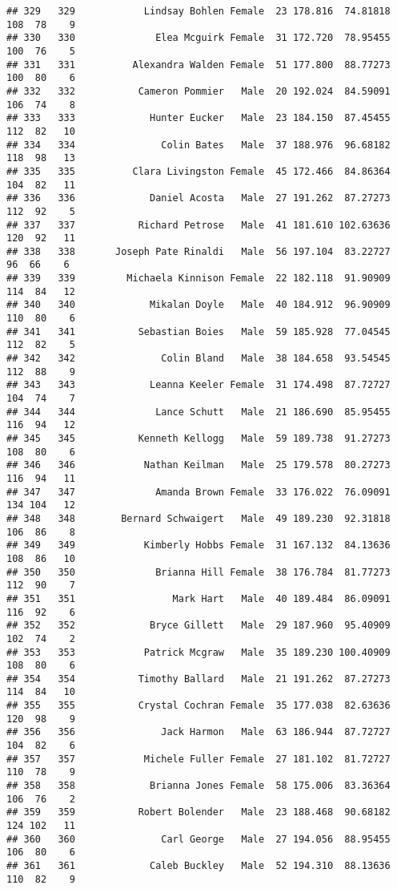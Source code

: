 \documentclass[
]{article}
\begin{document}
\begin{verbatim}
## 329   329            Lindsay Bohlen Female  23 178.816  74.81818 108  78    9
## 330   330              Elea Mcguirk Female  31 172.720  78.95455 100  76    5
## 331   331          Alexandra Walden Female  51 177.800  88.77273 100  80    6
## 332   332           Cameron Pommier   Male  20 192.024  84.59091 106  74    8
## 333   333             Hunter Eucker   Male  23 184.150  87.45455 112  82   10
## 334   334               Colin Bates   Male  37 188.976  96.68182 118  98   13
## 335   335          Clara Livingston Female  45 172.466  84.86364 104  82   11
## 336   336             Daniel Acosta   Male  27 191.262  87.27273 112  92    5
## 337   337           Richard Petrose   Male  41 181.610 102.63636 120  92   11
## 338   338       Joseph Pate Rinaldi   Male  56 197.104  83.22727  96  66    6
## 339   339         Michaela Kinnison Female  22 182.118  91.90909 114  84   12
## 340   340             Mikalan Doyle   Male  40 184.912  96.90909 110  80    6
## 341   341           Sebastian Boies   Male  59 185.928  77.04545 112  82    5
## 342   342               Colin Bland   Male  38 184.658  93.54545 112  88    9
## 343   343             Leanna Keeler Female  31 174.498  87.72727 104  74    7
## 344   344              Lance Schutt   Male  21 186.690  85.95455 116  94   12
## 345   345           Kenneth Kellogg   Male  59 189.738  91.27273 108  80    6
## 346   346            Nathan Keilman   Male  25 179.578  80.27273 116  94   11
## 347   347              Amanda Brown Female  33 176.022  76.09091 134 104   12
## 348   348        Bernard Schwaigert   Male  49 189.230  92.31818 106  86    8
## 349   349            Kimberly Hobbs Female  31 167.132  84.13636 108  86   10
## 350   350              Brianna Hill Female  38 176.784  81.77273 112  90    7
## 351   351                 Mark Hart   Male  40 189.484  86.09091 116  92    6
## 352   352             Bryce Gillett   Male  29 187.960  95.40909 102  74    2
## 353   353            Patrick Mcgraw   Male  35 189.230 100.40909 108  80    6
## 354   354           Timothy Ballard   Male  21 191.262  87.27273 114  84   10
## 355   355           Crystal Cochran Female  35 177.038  82.63636 120  98    9
## 356   356               Jack Harmon   Male  63 186.944  87.72727 104  82    6
## 357   357            Michele Fuller Female  27 181.102  81.72727 110  78    9
## 358   358             Brianna Jones Female  58 175.006  83.36364 106  76    2
## 359   359           Robert Bolender   Male  23 188.468  90.68182 124 102   11
## 360   360               Carl George   Male  27 194.056  88.95455 106  80    6
## 361   361             Caleb Buckley   Male  52 194.310  88.13636 110  82    9

\end{verbatim}
\end{document}
